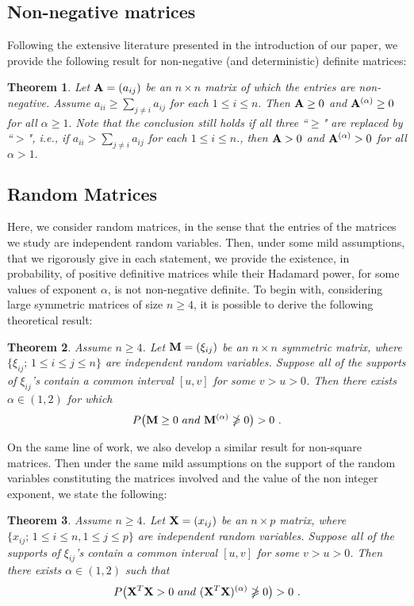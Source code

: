 \documentclass[conference,letterpaper]{IEEEtran}
\numberwithin{equation}{section}
\newcommand{\lbl}{\label}
\newcommand{\bd}{\bold}
\newcommand{\beaa}{\begin{eqnarray*}}
\newcommand{\eeaa}{\end{eqnarray*}}
\newtheorem{theorem}{{\sc Theorem}}[section]
\begin{document}
\subsection{Non-negative matrices}
Following the extensive literature presented in the introduction of our paper, we provide the following result for non-negative (and deterministic) definite matrices:

\begin{theorem}\lbl{th:th1} Let $\bd{A}=(a_{ij})$ be an $n\times n$ matrix of which the entries are non-negative. Assume $a_{ii}\geq  \sum_{j\ne i}a_{ij}$ for each $1\leq i\leq n.$ Then $\bd{A} \geq 0$ and $\bd{A}^{(\alpha)}\geq  0$ for all $\alpha\geq 1.$ 
Note that the conclusion still holds if all three ``$\geq$" are replaced by ``$>$", \textit{i.e.}, if $a_{ii} >  \sum_{j\ne i}a_{ij}$ for each $1\leq i\leq n.$, then $\bd{A} > 0$ and $\bd{A}^{(\alpha)}>  0$ for all $\alpha> 1.$ 

\end{theorem}


\subsection{Random Matrices}
Here, we consider random matrices, in the sense that the entries of the matrices we study are independent random variables.
Then, under some mild assumptions, that we rigorously give in each statement, we provide the existence, in probability, of positive definitive matrices while their Hadamard power, for some values of exponent $\alpha$, is not non-negative definite.
To begin with, considering large symmetric matrices of size $n \geq 4$, it is possible to derive the following theoretical result:
\begin{theorem}\lbl{th:th2} Assume $n\geq 4$.   Let $\bd{M}=(\xi_{ij})$ be an $n\times n$ symmetric matrix, where $\{\xi_{ij};\, 1\leq i \leq j \leq n\}$ are independent random variables. 
Suppose all of the supports of $\xi_{ij}$'s contain  a common interval $[u, v]$ for some $v>u>0$. Then there exists $\alpha \in (1, 2)$ for which
\beaa
P\big(\bd{M}\geq 0\ \mbox{and}\ \bd{M}^{(\alpha)} \ngeqslant 0\big)>0 \ .
\eeaa
\end{theorem}

On the same line of work, we also develop a similar result for non-square matrices. Then under the same mild assumptions on the support of the random variables constituting the matrices involved and the value of the non integer exponent, we state the following:
\begin{theorem}\lbl{th:th3} Assume $n\geq 4$.   Let $\bd{X}=(x_{ij})$ be an $n\times p$  matrix, where $\{x_{ij};\, 1\leq i \leq n, 1\leq j \leq p\}$ are independent random variables. Suppose all of the supports of $\xi_{ij}$'s contain  a common interval $[u, v]$ for some $v>u>0$. Then there exists $\alpha \in (1, 2)$ such that
\beaa
P\big(\bd{X}^T\bd{X}>0\ \mbox{and}\ (\bd{X}^T\bd{X})^{(\alpha)}\ngeqslant 0\big)>0 \ .
\eeaa
\end{theorem}
\end{document}
